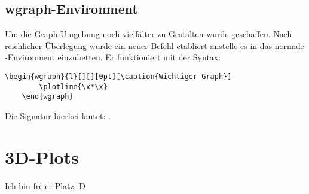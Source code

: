 \subsection{wgraph-Environment}
Um die Graph-Umgebung noch vielfälter zu Gestalten wurde  geschaffen.
Nach reichlicher Überlegung wurde ein neuer Befehl etabliert anstelle es in das
normale -Environment einzubetten. Er funktioniert mit der Syntax:
\begin{lstlisting}[language=lLatex,frame=none,breaklines=true]
    \begin{wgraph}{l}[][][0pt][\caption{Wichtiger Graph}]
        \plotline{\x*\x}
    \end{wgraph}
\end{lstlisting}
Die Signatur hierbei lautet: .

\section{3D-Plots }
Ich bin freier Platz :D
\renewcommand{\arraystretch}{1}
